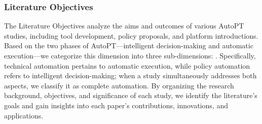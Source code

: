 

\subsubsection{Literature Objectives}


The Literature Objectives analyze the aims and outcomes of various AutoPT studies, including tool development, policy proposals, and platform introductions. Based on the two phases of AutoPT—intelligent decision-making and automatic execution—we categorize this dimension into three sub-dimensions: . 
Specifically, technical automation pertains to automatic execution, while policy automation refers to intelligent decision-making; when a study simultaneously addresses both aspects, we classify it as complete automation.
By organizing the research background, objectives, and significance of each study, we identify the literature's goals and gain insights into each paper's contributions, innovations, and applications.



